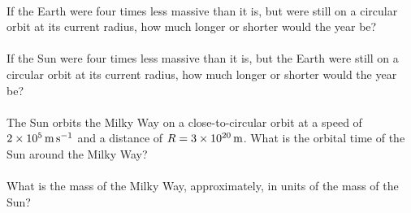 \documentclass[12pt]{article}
\begin{document}
\paragraph{\theproblem}%
If the Earth were four times less massive than it is, but were still on
a circular orbit at its current radius, how much longer or shorter
would the year be?

\paragraph{\theproblem}%
If the Sun were four times less massive than it is, but the Earth were
still on a circular orbit at its current radius, how much longer or
shorter would the year be?

\paragraph{\theproblem}%
The Sun orbits the Milky Way on a close-to-circular orbit at a speed
of $2\times 10^5\,\mathrm{m}\,\mathrm{s}^{-1}$ and a distance of $R= 3\times 10^{20}\,\mathrm{m}$.
What is the orbital time of the Sun around the Milky Way?

\paragraph{\theproblem}%
What is the mass of the Milky Way, approximately, in units of the mass
of the Sun?
\end{document}
